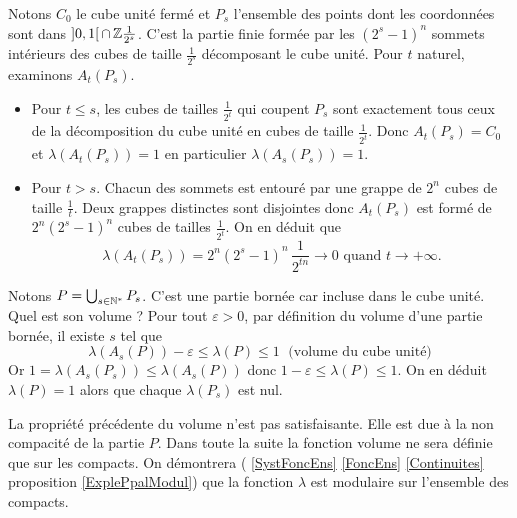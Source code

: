 \begin{explen}\label{exple:VolSommetsBorn}
Notons $C_0$ le cube unité fermé et $P_s$ l'ensemble des points dont les coordonnées sont dans $]0,1[\,\cap\, \mathbb{Z} \frac{1}{2^s}$. C'est la partie finie formée par les $(2^s -1)^n$ sommets intérieurs des cubes de taille $\frac{1}{2^s}$ décomposant le cube unité.\newline
Pour $t$ naturel, examinons $A_t(P_s)$.
  \begin{itemize}
    \item Pour $t \leq s$, les cubes de tailles $\frac{1}{2^t}$ qui coupent $P_s$ sont exactement tous ceux de la décomposition du cube unité en cubes de taille $\frac{1}{2^t}$. Donc $A_t(P_s) = C_0$ et $\lambda(A_t(P_s))=1$ en particulier $\lambda(A_s(P_s))=1$.
    \item Pour $t > s$. Chacun des sommets est entouré par une grappe de $2^n$ cubes de taille $\frac{1}{t}$. Deux grappes distinctes sont disjointes donc $A_t(P_s)$ est formé de $2^n (2^s -1)^n$ cubes de tailles $\frac{1}{2^t}$. On en déduit que
      \begin{displaymath}
  \lambda(A_t(P_s)) = 2^n (2^s -1)^n\, \frac{1}{2^{tn}} \rightarrow 0 \text{ quand } t\rightarrow +\infty.
      \end{displaymath}
  \end{itemize}
Notons $P = \bigcup_{s \in \mathbb{N}^*} P_s$. C'est une partie bornée car incluse dans le cube unité. Quel est son volume ?\newline
Pour tout $\varepsilon >0$, par définition du volume d'une partie bornée, il existe $s$ tel que
\begin{displaymath}
 \lambda(A_s(P))- \varepsilon \leq \lambda(P) \leq 1 \; \text{ (volume du cube unité)}
\end{displaymath}
Or  $1 = \lambda(A_s(P_s))\leq \lambda(A_s(P))$ donc $1 - \varepsilon \leq \lambda(P) \leq 1$.\newline
On en déduit $\lambda(P)=1$ alors que chaque $\lambda(P_s)$ est nul.
\end{explen}

\noindent La propriété précédente du volume n'est pas satisfaisante. Elle est due à la non compacité de la partie $P$. Dans toute la suite la fonction volume ne sera définie que sur les compacts.\newline
On démontrera ( \ref{SystFoncEns} \ref{FoncEns} \ref{Continuites} proposition \ref{ExplePpalModul}) que la fonction $\lambda$ est modulaire sur l'ensemble des compacts.

